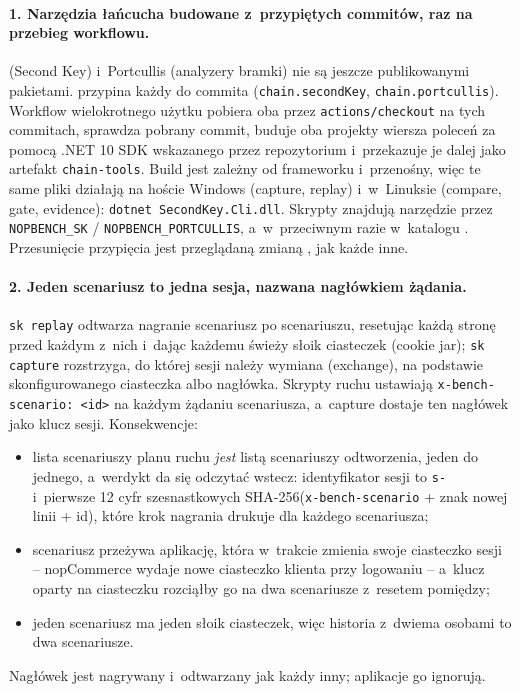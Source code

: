 \paragraph{1. Narzędzia łańcucha budowane z~przypiętych commitów, raz na przebieg
workflowu.}  (Second Key) i~Portcullis (analyzery bramki) nie są jeszcze
publikowanymi pakietami.  przypina każdy do commita
(\texttt{chain.secondKey}, \texttt{chain.portcullis}). Workflow wielokrotnego użytku
 pobiera oba przez \texttt{actions/checkout} na tych commitach,
sprawdza pobrany commit, buduje oba projekty wiersza poleceń za pomocą .NET 10 SDK
wskazanego przez  repozytorium  i~przekazuje je dalej jako
artefakt \texttt{chain-tools}. Build jest zależny od frameworku i~przenośny, więc te same
pliki działają na hoście Windows (capture, replay) i~w~Linuksie (compare, gate, evidence):
\texttt{dotnet SecondKey.Cli.dll}. Skrypty znajdują narzędzie przez
\texttt{NOPBENCH\_SK} / \texttt{NOPBENCH\_PORTCULLIS}, a~w~przeciwnym razie w~katalogu
. Przesunięcie przypięcia jest przeglądaną zmianą
, jak każde inne.

\paragraph{2. Jeden scenariusz to jedna sesja, nazwana nagłówkiem żądania.}
\texttt{sk replay} odtwarza nagranie scenariusz po scenariuszu, resetując każdą stronę
przed każdym z~nich i~dając każdemu świeży słoik ciasteczek (cookie jar); \texttt{sk
capture} rozstrzyga, do której sesji należy wymiana (exchange), na podstawie
skonfigurowanego ciasteczka albo nagłówka. Skrypty ruchu ustawiają
\texttt{x-bench-scenario: <id>} na każdym żądaniu scenariusza, a~capture dostaje ten
nagłówek jako klucz sesji. Konsekwencje:
\begin{itemize}
  \item lista scenariuszy planu ruchu \emph{jest} listą scenariuszy odtworzenia, jeden do
    jednego, a~werdykt da się odczytać wstecz: identyfikator sesji to \texttt{s-} i~pierwsze
    12 cyfr szesnastkowych SHA-256(\texttt{x-bench-scenario} + znak nowej linii + id),
    które krok nagrania drukuje dla każdego scenariusza;
  \item scenariusz przeżywa aplikację, która w~trakcie zmienia swoje ciasteczko sesji --
    nopCommerce wydaje nowe ciasteczko klienta przy logowaniu -- a~klucz oparty na
    ciasteczku rozciąłby go na dwa scenariusze z~resetem pomiędzy;
  \item jeden scenariusz ma jeden słoik ciasteczek, więc historia z~dwiema osobami to
    dwa scenariusze.
\end{itemize}
Nagłówek jest nagrywany i~odtwarzany jak każdy inny; aplikacje go ignorują.

